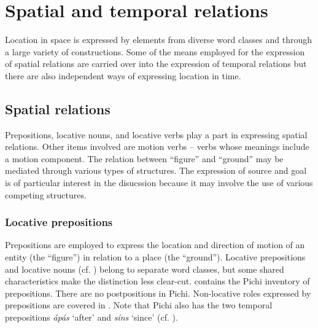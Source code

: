 \chapter{Spatial and temporal relations}

Location in space is expressed by elements from diverse word classes and through a large variety of constructions. Some of the means employed for the expression of spatial relations are carried over into the expression of temporal relations but there are also independent ways of expressing location in time. 

\section{Spatial relations}\label{sec:8.1}

Prepositions, locative nouns, and locative verbs play a part in expressing spatial relations. Other items involved are motion verbs – verbs whose meanings include a motion component. The relation between “figure” and “ground” may be mediated through various types of structures. The expression of source and goal is of particular interest in the disucssion because it may involve the use of various competing structures.

\subsection{Locative prepositions}\label{sec:8.1.1}

Prepositions are employed to express the location and direction of motion of an entity (the “figure”) in relation to a place (the “ground”). Locative prepositions and locative nouns (cf. ) belong to separate word classes, but some shared characteristics make the distinction less clear-cut.  contains the Pichi inventory of prepositions. There are no postpositions in Pichi. Non-locative roles expressed by prepositions are covered in . Note that Pichi also has the two temporal prepositions \textit{ápás} ‘after’ and \textit{síns} ‘since’ (cf. ).

